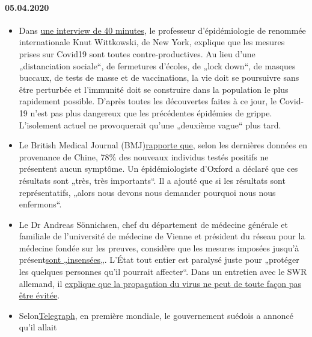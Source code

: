 \hypertarget{05042020-1}{%
\paragraph{05.04.2020}\label{05042020-1}}

\begin{itemize}
\tightlist
\item
  Dans \href{https://www.youtube.com/watch?v=lGC5sGdz4kg}{une interview
  de 40 minutes}, le professeur d'épidémiologie de renommée
  internationale Knut Wittkowski, de New York, explique que les mesures
  prises sur Covid19 sont toutes contre-productives. Au lieu d'une
  „distanciation sociale``, de fermetures d'écoles, de „lock down``, de
  masques buccaux, de tests de masse et de vaccinations, la vie doit se
  poursuivre sans être perturbée et l'immunité doit se construire dans
  la population le plus rapidement possible. D'après toutes les
  découvertes faites à ce jour, le Covid-19 n'est pas plus dangereux que
  les précédentes épidémies de grippe. L'isolement actuel ne
  provoquerait qu'une „deuxième vague`` plus tard.
\item
  Le British Medical Journal
  (BMJ)\href{https://www.bmj.com/content/369/bmj.m1375}{rapporte que},
  selon les dernières données en provenance de Chine, 78\% des nouveaux
  individus testés positifs ne présentent aucun symptôme. Un
  épidémiologiste d'Oxford a déclaré que ces résultats sont „très, très
  importants``. Il a ajouté que si les résultats sont représentatifs,
  „alors nous devons nous demander pourquoi nous nous enfermons``.
\item
  Le Dr Andreas Sönnichsen, chef du département de médecine générale et
  familiale de l'université de médecine de Vienne et président du réseau
  pour la médecine fondée sur les preuves, considère que les mesures
  imposées jusqu'à
  présent\href{https://www.diepresse.com/5794224/was-machen-wir-da-auf-den-intensivstationen-eigentlich}{sont
  „insensées}„. L'État tout entier est paralysé juste pour „protéger les
  quelques personnes qu'il pourrait affecter``. Dans un entretien avec
  le SWR allemand, il
  \href{https://www.swr.de/swraktuell/radio/im-gespraech/corona-krise-wir-kommen-nicht-an-der-ausbreitung-vorbei-100.html}{explique
  que la propagation du virus ne peut de toute façon pas être évitée}.
\item
  Selon\href{https://www.telegraph.co.uk/news/2020/04/03/coronavirus-swedish-experiment-could-prove-britain-wrong/}{Telegraph},
  en première mondiale, le gouvernement suédois a annoncé qu'il allait

\end{itemize}
